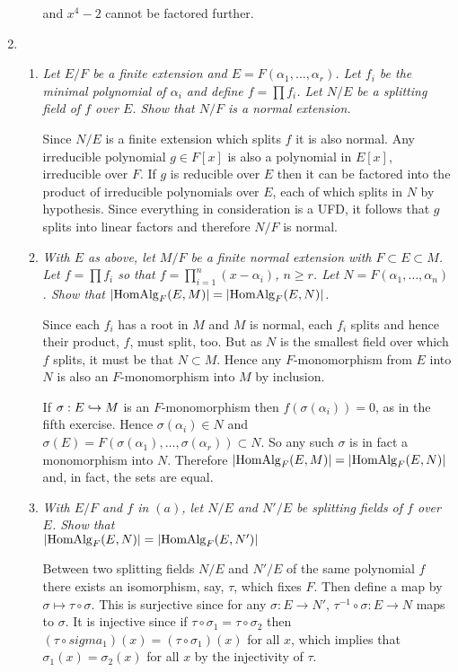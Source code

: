\documentclass[10pt]{article}
\begin{document}
\begin{enumerate}
\begin{enumerate}
and $x^4 - 2$ cannot be factored further.
\end{enumerate}

\item
\begin{enumerate}
\item \emph{Let $E/F$ be a finite extension and $E = F(\alpha_1, \ldots, \alpha_r)$.  Let $f_i$ be the minimal polynomial of $\alpha_i$ and define $f = \prod f_i$.  Let $N/E$ be a splitting field of $f$ over $E$.  Show that $N/F$ is a normal extension.}

Since $N/E$ is a finite extension which splits $f$ it is also normal.  Any irreducible polynomial $g \in F[x]$ is also a polynomial in $E[x]$, irreducible over $F$.  If $g$ is reducible over $E$ then it can be factored into the product of irreducible polynomials over $E$, each of which splits in $N$ by hypothesis.  Since everything in consideration is a UFD, it follows that $g$ splits into linear factors and therefore $N/F$ is normal.

\item \emph{With $E$ as above, let $M/F$ be a finite normal extension with $F \subset E \subset M$.  Let $f = \prod f_i$ so that $f = \prod_{i=1}^n (x - \alpha_i)$, $n \geq r$.  Let $N = F(\alpha_1, \ldots, \alpha_n)$.  Show that $\left| \operatorname{HomAlg}_F(E,M) \right| = \left| \operatorname{HomAlg}_F(E,N) \right|$.}

Since each $f_i$ has a root in $M$ and $M$ is normal, each $f_i$ splits and hence their product, $f$, must split, too.  But as $N$ is the smallest field over which $f$ splits, it must be that $N \subset M$.  Hence any $F$-monomorphism from $E$ into $N$ is also an $F$-monomorphism into $M$ by inclusion.

If $\sigma: E \hookrightarrow M$ is an $F$-monomorphism then $f(\sigma(\alpha_i)) = 0$, as in the fifth exercise.  Hence $\sigma(\alpha_i) \in N$ and $\sigma(E) = F(\sigma(\alpha_1), \ldots, \sigma(\alpha_r)) \subset N$.  So any such $\sigma$ is in fact a monomorphism into $N$.  Therefore $\left| \operatorname{HomAlg}_F(E,M) \right| = \left| \operatorname{HomAlg}_F(E,N) \right|$ and, in fact, the sets are equal.

\item \emph{With $E/F$ and $f$ in $(a)$, let $N/E$ and $N'/E$ be splitting fields of $f$ over $E$.  Show that \\ $\left| \operatorname{HomAlg}_F(E,N) \right| = \left| \operatorname{HomAlg}_F(E,N') \right|$}

Between two splitting fields $N/E$ and $N'/E$ of the same polynomial $f$ there exists an isomorphism, say, $\tau$, which fixes $F$. Then define a map by $\sigma \mapsto \tau \circ \sigma$.  This is surjective since for any $\sigma: E \rightarrow N'$, $\tau^{-1} \circ \sigma: E \rightarrow N$ maps to $\sigma$.  It is injective since if $\tau \circ \sigma_1 = \tau \circ \sigma_2$ then $(\tau \circ sigma_1)(x) = (\tau \circ \sigma_1)(x)$ for all $x$, which implies that $\sigma_1(x) = \sigma_2(x)$ for all $x$ by the injectivity of $\tau$.


\end{enumerate}
\end{enumerate}
\end{document}
